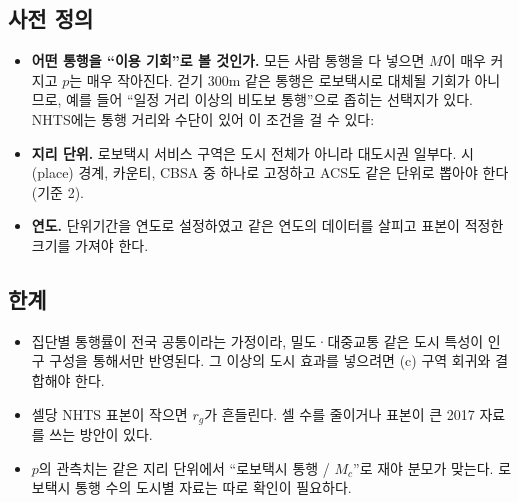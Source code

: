 \documentclass[10pt,a4paper]{article}
\begin{document}
\subsection{사전 정의}

\begin{itemize}[leftmargin=*,itemsep=2pt]
\item \textbf{어떤 통행을 ``이용 기회''로 볼 것인가.} 모든 사람 통행을 다 넣으면 $M$이 매우 커지고 $p$는 매우 작아진다. 걷기 300m 같은 통행은 로보택시로 대체될 기회가 아니므로, 예를 들어 ``일정 거리 이상의 비도보 통행''으로 좁히는 선택지가 있다. NHTS에는 통행 거리와 수단이 있어 이 조건을 걸 수 있다:

\item \textbf{지리 단위.} 로보택시 서비스 구역은 도시 전체가 아니라 대도시권 일부다. 시(place) 경계, 카운티, CBSA 중 하나로 고정하고 ACS도 같은 단위로 뽑아야 한다(기준 2).
\item \textbf{연도.} 단위기간을 연도로 설정하였고 같은 연도의 데이터를 살피고 표본이 적정한 크기를 가져야 한다.

\end{itemize}

\subsection{한계}

\begin{itemize}[leftmargin=*,itemsep=2pt]
\item 집단별 통행률이 전국 공통이라는 가정이라, 밀도·대중교통 같은 도시 특성이 인구 구성을 통해서만 반영된다. 그 이상의 도시 효과를 넣으려면 (c) 구역 회귀와 결합해야 한다.
\item 셀당 NHTS 표본이 작으면 $r_g$가 흔들린다. 셀 수를 줄이거나 표본이 큰 2017 자료를 쓰는 방안이 있다.
\item $p$의 관측치는 같은 지리 단위에서 ``로보택시 통행 / $M_c$''로 재야 분모가 맞는다. 로보택시 통행 수의 도시별 자료는 따로 확인이 필요하다.
\end{itemize}
\end{document}
